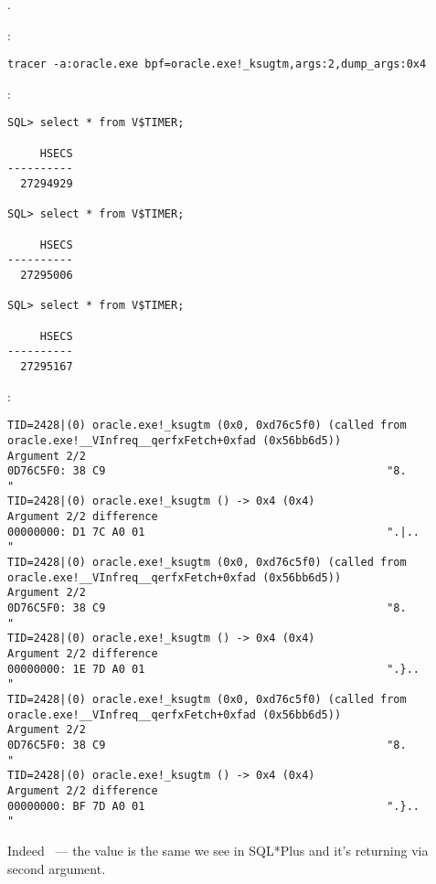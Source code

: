 .

:

\begin{lstlisting}
tracer -a:oracle.exe bpf=oracle.exe!_ksugtm,args:2,dump_args:0x4
\end{lstlisting}

:

\begin{lstlisting}
SQL> select * from V$TIMER;

     HSECS
----------
  27294929

SQL> select * from V$TIMER;

     HSECS
----------
  27295006

SQL> select * from V$TIMER;

     HSECS
----------
  27295167
\end{lstlisting}

:

\begin{lstlisting}
TID=2428|(0) oracle.exe!_ksugtm (0x0, 0xd76c5f0) (called from oracle.exe!__VInfreq__qerfxFetch+0xfad (0x56bb6d5))
Argument 2/2
0D76C5F0: 38 C9                                           "8.              "
TID=2428|(0) oracle.exe!_ksugtm () -> 0x4 (0x4)
Argument 2/2 difference
00000000: D1 7C A0 01                                     ".|..            "
TID=2428|(0) oracle.exe!_ksugtm (0x0, 0xd76c5f0) (called from oracle.exe!__VInfreq__qerfxFetch+0xfad (0x56bb6d5))
Argument 2/2
0D76C5F0: 38 C9                                           "8.              "
TID=2428|(0) oracle.exe!_ksugtm () -> 0x4 (0x4)
Argument 2/2 difference
00000000: 1E 7D A0 01                                     ".}..            "
TID=2428|(0) oracle.exe!_ksugtm (0x0, 0xd76c5f0) (called from oracle.exe!__VInfreq__qerfxFetch+0xfad (0x56bb6d5))
Argument 2/2
0D76C5F0: 38 C9                                           "8.              "
TID=2428|(0) oracle.exe!_ksugtm () -> 0x4 (0x4)
Argument 2/2 difference
00000000: BF 7D A0 01                                     ".}..            "
\end{lstlisting}

{Indeed ~--- the value is the same we see in SQL*Plus and it's returning via second argument}.

